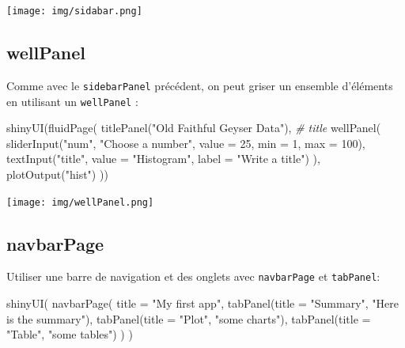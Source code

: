 \documentclass[
]{article}
\newenvironment{Shaded}{\begin{snugshade}}{\end{snugshade}}
\newcommand{\AttributeTok}[1]{\textcolor[rgb]{0.77,0.63,0.00}{#1}}
\newcommand{\CommentTok}[1]{\textcolor[rgb]{0.56,0.35,0.01}{\textit{#1}}}
\newcommand{\DecValTok}[1]{\textcolor[rgb]{0.00,0.00,0.81}{#1}}
\newcommand{\FunctionTok}[1]{\textcolor[rgb]{0.00,0.00,0.00}{#1}}
\newcommand{\NormalTok}[1]{#1}
\newcommand{\StringTok}[1]{\textcolor[rgb]{0.31,0.60,0.02}{#1}}
\begin{document}
\texttt{[image: img/sidabar.png]}

\hypertarget{wellpanel}{%
\subsection{wellPanel}\label{wellpanel}}

Comme avec le \texttt{sidebarPanel} précédent, on peut griser un
ensemble d'éléments en utilisant un \texttt{wellPanel} :

\begin{Shaded}
\begin{Highlighting}[]
\FunctionTok{shinyUI}\NormalTok{(}\FunctionTok{fluidPage}\NormalTok{(}
  \FunctionTok{titlePanel}\NormalTok{(}\StringTok{"Old Faithful Geyser Data"}\NormalTok{), }\CommentTok{\# title}
  \FunctionTok{wellPanel}\NormalTok{(}
    \FunctionTok{sliderInput}\NormalTok{(}\StringTok{"num"}\NormalTok{, }\StringTok{"Choose a number"}\NormalTok{, }\AttributeTok{value =} \DecValTok{25}\NormalTok{, }\AttributeTok{min =} \DecValTok{1}\NormalTok{, }\AttributeTok{max =} \DecValTok{100}\NormalTok{),  }
    \FunctionTok{textInput}\NormalTok{(}\StringTok{"title"}\NormalTok{, }\AttributeTok{value =} \StringTok{"Histogram"}\NormalTok{, }\AttributeTok{label =} \StringTok{"Write a title"}\NormalTok{)}
\NormalTok{  ),}
  \FunctionTok{plotOutput}\NormalTok{(}\StringTok{"hist"}\NormalTok{)}
\NormalTok{))}
\end{Highlighting}
\end{Shaded}

\texttt{[image: img/wellPanel.png]}

\hypertarget{navbarpage}{%
\subsection{navbarPage}\label{navbarpage}}

Utiliser une barre de navigation et des onglets avec \texttt{navbarPage}
et \texttt{tabPanel}:

\begin{Shaded}
\begin{Highlighting}[]
\FunctionTok{shinyUI}\NormalTok{(}
  \FunctionTok{navbarPage}\NormalTok{(}
    \AttributeTok{title =} \StringTok{"My first app"}\NormalTok{,}
    \FunctionTok{tabPanel}\NormalTok{(}\AttributeTok{title =} \StringTok{"Summary"}\NormalTok{,}
             \StringTok{"Here is the summary"}\NormalTok{),}
    \FunctionTok{tabPanel}\NormalTok{(}\AttributeTok{title =} \StringTok{"Plot"}\NormalTok{,}
             \StringTok{"some charts"}\NormalTok{),}
    \FunctionTok{tabPanel}\NormalTok{(}\AttributeTok{title =} \StringTok{"Table"}\NormalTok{,}
             \StringTok{"some tables"}\NormalTok{)}
\NormalTok{  )}
\NormalTok{)}
\end{Highlighting}
\end{Shaded}
\end{document}
